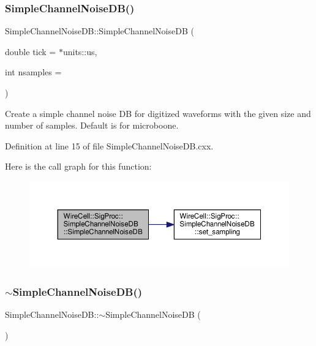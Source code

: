 \subsubsection{\texorpdfstring{Simple\+Channel\+Noise\+D\+B()}{SimpleChannelNoiseDB()}}
{\footnotesize\ttfamily Simple\+Channel\+Noise\+D\+B\+::\+Simple\+Channel\+Noise\+DB (\begin{DoxyParamCaption}\item[{double}]{tick = {$\ast$units\+:\+:us},  }\item[{int}]{nsamples = {} }\end{DoxyParamCaption})}

Create a simple channel noise DB for digitized waveforms with the given size and number of samples. Default is for microboone. 

Definition at line 15 of file Simple\+Channel\+Noise\+D\+B.\+cxx.

Here is the call graph for this function\+:
\nopagebreak
\begin{figure}[H]
\begin{center}
\leavevmode
\includegraphics[width=350pt]{class_wire_cell_1_1_sig_proc_1_1_simple_channel_noise_d_b_af86bbcf1a79a98850b9ca24a0e9bd2e3_cgraph}
\end{center}
\end{figure}
\mbox{\label{class_wire_cell_1_1_sig_proc_1_1_simple_channel_noise_d_b_ae81f9ee2d711c72b272fadcb5d702979}} 
\subsubsection{\texorpdfstring{$\sim$\+Simple\+Channel\+Noise\+D\+B()}{~SimpleChannelNoiseDB()}}
{\footnotesize\ttfamily Simple\+Channel\+Noise\+D\+B\+::$\sim$\+Simple\+Channel\+Noise\+DB (\begin{DoxyParamCaption}{ }\end{DoxyParamCaption})\hspace{0.3cm}{\ttfamily [virtual]}}



